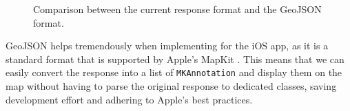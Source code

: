 \begin{figure}[H]
    \centering
    \hspace{0.5cm} %
    \caption{Comparison between the current response format and the GeoJSON format.}
\end{figure}

GeoJSON helps tremendously when implementing for the iOS app, as it is a standard format that is supported by Apple's MapKit \cite{mkgeojsonobject}. This means that we can easily convert the response into a list of \lstinline{MKAnnotation} and display them on the map without having to parse the original response to dedicated classes, saving development effort and adhering to Apple's best practices.